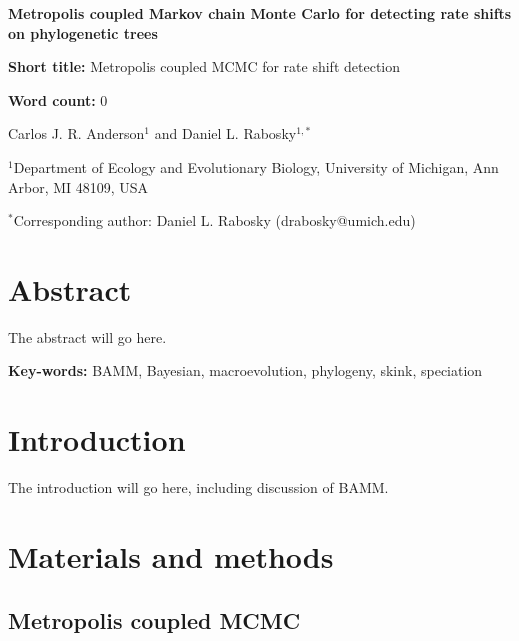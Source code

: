 \documentclass[12pt]{article}
\begin{document}
\baselineskip 24pt

\begin{flushleft}

{\Large\textbf{Metropolis coupled Markov chain Monte Carlo
    for detecting rate shifts on phylogenetic trees}}

\textbf{Short title:} Metropolis coupled MCMC for rate shift detection

\textbf{Word count:} 0

Carlos J. R. Anderson$^{1}$ and
Daniel L. Rabosky$^{1,*}$

$^{1}$Department of Ecology and Evolutionary Biology,
    University of Michigan, Ann Arbor, MI 48109, USA

$^{*}$Corresponding author: Daniel L. Rabosky (drabosky@umich.edu)

\end{flushleft}


\pagebreak[4]


\section*{Abstract}

The abstract will go here.

\begin{flushleft}
\textbf{Key-words:} BAMM, Bayesian, macroevolution, phylogeny, skink, speciation
\end{flushleft}


\pagebreak[4]


\section*{Introduction}

The introduction will go here, including discussion of BAMM.


\section*{Materials and methods}

\subsection*{Metropolis coupled MCMC}
\end{document}
